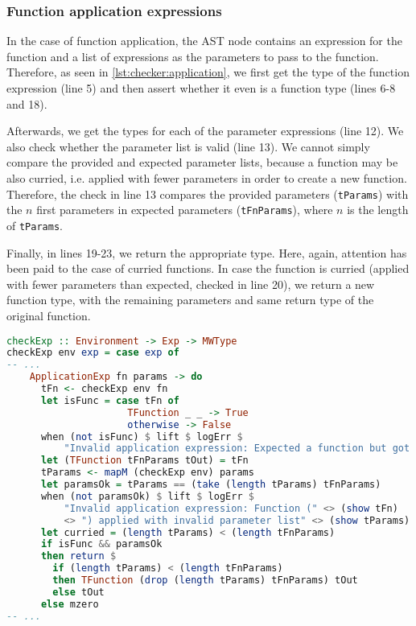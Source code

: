 \subsubsection{Function application expressions}
In the case of function application, the AST node contains an expression for the function and a list of expressions as the parameters to pass to the function. Therefore, as seen in \cref{lst:checker:application}, we first get the type of the function expression (line 5) and then assert whether it even is a function type (lines 6-8 and 18). 
\par Afterwards, we get the types for each of the parameter expressions (line 12). We also check whether the parameter list is valid (line 13). We cannot simply compare the provided and expected parameter lists, because a function may be also curried, i.e. applied with fewer parameters in order to create a new function. Therefore, the check in line 13 compares the provided parameters (\lstinline{tParams}) with the $n$ first parameters in expected parameters (\lstinline{tFnParams}), where $n$ is the length of \lstinline{tParams}. 
\par Finally, in lines 19-23, we return the appropriate type. Here, again, attention has been paid to the case of curried functions. In case the function is curried (applied with fewer parameters than expected, checked in line 20), we return a new function type, with the remaining parameters and same return type of the original function.
\begin{lstlisting}[language=haskell,
caption={Handler for function application expressions},
label=lst:checker:application]
checkExp :: Environment -> Exp -> MWType
checkExp env exp = case exp of
-- ...
    ApplicationExp fn params -> do
      tFn <- checkExp env fn
      let isFunc = case tFn of
                     TFunction _ _ -> True
                     otherwise -> False
      when (not isFunc) $ lift $ logErr $
          "Invalid application expression: Expected a function but got " <> (show tFn)
      let (TFunction tFnParams tOut) = tFn
      tParams <- mapM (checkExp env) params
      let paramsOk = tParams == (take (length tParams) tFnParams)
      when (not paramsOk) $ lift $ logErr $
          "Invalid application expression: Function (" <> (show tFn)
          <> ") applied with invalid parameter list" <> (show tParams)
      let curried = (length tParams) < (length tFnParams)
      if isFunc && paramsOk
      then return $
        if (length tParams) < (length tFnParams)
        then TFunction (drop (length tParams) tFnParams) tOut
        else tOut
      else mzero
-- ...
\end{lstlisting}

